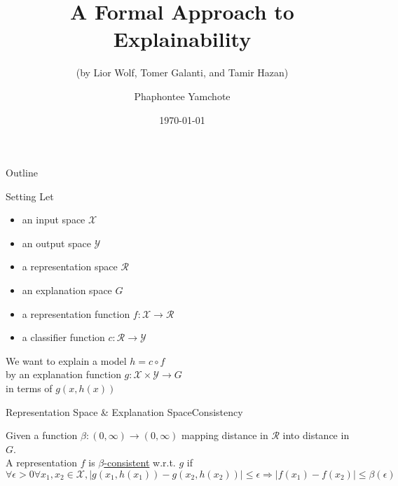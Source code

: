 \documentclass[10pt, aspectratio=169]{beamer}
\title{A Formal Approach to Explainability}
\subtitle{(by Lior Wolf, Tomer Galanti, and Tamir Hazan)}
\date{\today}
\author{Phaphontee Yamchote}
\begin{document}
	\titlepage
	\begin{frame}{Outline}
		\tableofcontents
	\end{frame}
	\begin{frame}{Setting}
		Let 
		\begin{itemize}
			\item an input space $\mathcal{X}$
			\item an output space $\mathcal{Y}$ 
			\item a representation space $\mathcal{R}$
			\item an explanation space $G$
			\item a representation function $f:\mathcal{X}\to\mathcal{R}$
			\item a classifier function $c:\mathcal{R}\to\mathcal{Y}$
		\end{itemize}
		
		We want to explain a model $h = c\circ f$\\
		by an explanation function $g:\mathcal{X}\times\mathcal{Y}\to G$\\
		in terms of $g(x,h(x))$

	\end{frame}
	\begin{frame}[t]{Representation Space \& Explanation Space}{Consistency}
		\begin{definition}
			Given a function $\beta: (0, \infty)\to (0, \infty)$ mapping distance in $\mathcal{R}$ into distance in $G$.\\
			A representation $f$ is \underline{$\beta$-consistent} w.r.t. $g$ if
			$$
			\forall\epsilon>0\forall x_1, x_2 \in \mathcal{X}, \left|g(x_1, h(x_1)) - g(x_2,h(x_2))\right|\leqslant\epsilon \Rightarrow \left|f(x_1) - f(x_2)\right|\leqslant \beta(\epsilon)
			$$
		\end{definition}
	\end{frame}
\end{document}
